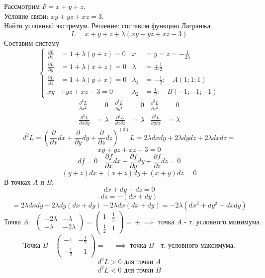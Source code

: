 \documentclass[12pt]{article}
\begin{document}
    \begin{adjustwidth}{1.5em}{1.5em}
        Рассмотрим $F = x + y + z$.\\
        Условие связи: $xy + yz + xz = 3$.\\
        Найти условный экстремум.
        Решение: составим функцию Лагранжа.
        \[ L = x + y + z + \lambda (xy + yz + xz - 3) \]
        Составим систему
        \[ \left\lbrace\begin{aligned}
            \frac{\partial L}{\partial x} &= 1 + \lambda (y + z) = 0 & x &= y = z = -\frac{1}{2\lambda}\\
            \frac{\partial L}{\partial y} &= 1 + \lambda (x + z) = 0 & \lambda &= \pm\frac{1}{2}\\
            \frac{\partial L}{\partial z} &= 1 + \lambda (y + x) = 0 & \lambda_1 &=-\frac{1}{2}: \quad A(1; 1; 1)\\
            xy &+ yz + xz - 3 = 0 & \lambda_2 &= \frac{1}{2}: \quad B(-1; -1; -1)
        \end{aligned}\right. \]
        \begin{align}
            \frac{\partial^2 L}{\partial x^2} &= 0 & \frac{\partial^2 L}{\partial y^2} &= 0 & \frac{\partial^2 L}{\partial z^2} &= 0\\
            \frac{\partial^2 L}{\partial x \partial y} &= \lambda & \frac{\partial^2 L}{\partial x \partial z} &= \lambda & \frac{\partial^2 L}{\partial y \partial z} &= \lambda
        \end{align}
        \[ d^2 L = \left( \frac{\partial}{\partial x}dx + \frac{\partial}{\partial y}dy + \frac{\partial}{\partial z}dz \right)^{(2)}L = 2\lambda dx dy + 2\lambda dy dz + 2 \lambda dx dz \boxed{=} \]
        \[ xy + yz + xz - 3 = 0 \]
        \[ df = 0 \quad \frac{\partial f}{\partial x}dx + \frac{\partial f}{\partial y}dy + \frac{\partial f}{\partial z}dz = 0 \]
        \[ (y+z)dx + (x+z)dy + (x+y)dz = 0 \]
        В точках $A$ и $B$:
        \[ dx + dy + dz = 0 \]
        \[ dz = -(dx + dy) \]
        \[ \boxed{=} 2\lambda dxdy - 2\lambda dy(dx + dy) - 2\lambda dx(dx + dy) = -2 \lambda (dx^2 + dy^2 + dxdy) \]
        \[ \text{Точка }A \quad \begin{pmatrix}
            -2\lambda & -\lambda \\
            -\lambda & -2\lambda
        \end{pmatrix} = \begin{pmatrix}
            1 & \frac{1}{2}\\
            \frac{1}{2} & 1
        \end{pmatrix} = \boxed{ + } \implies \text{ точка } A \text{ - т. условного минимума.} \]
        \[ \text{Точка }B \quad \begin{pmatrix}
            -1 & -\frac{1}{2}\\
            -\frac{1}{2} & -1
        \end{pmatrix} = \boxed{ - } \implies \text{ точка } B \text{ - т. условного максимума.} \]
        \[ d^2 L > 0 \text{ для точки }A \]
        \[ d^2 L < 0 \text{ для точки }B \]
    \end{adjustwidth}
\end{document}
